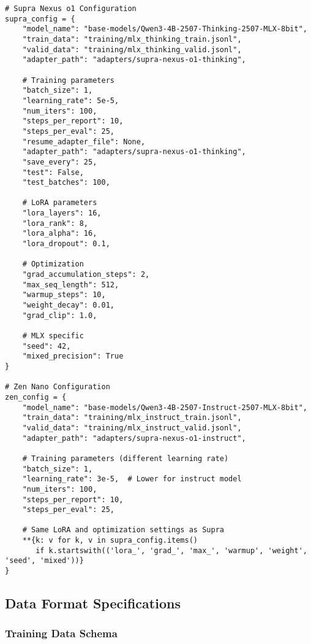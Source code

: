 \begin{lstlisting}[caption=Complete training configuration,label=lst:training-config]
# Supra Nexus o1 Configuration
supra_config = {
    "model_name": "base-models/Qwen3-4B-2507-Thinking-2507-MLX-8bit",
    "train_data": "training/mlx_thinking_train.jsonl",
    "valid_data": "training/mlx_thinking_valid.jsonl",
    "adapter_path": "adapters/supra-nexus-o1-thinking",
    
    # Training parameters
    "batch_size": 1,
    "learning_rate": 5e-5,
    "num_iters": 100,
    "steps_per_report": 10,
    "steps_per_eval": 25,
    "resume_adapter_file": None,
    "adapter_path": "adapters/supra-nexus-o1-thinking",
    "save_every": 25,
    "test": False,
    "test_batches": 100,
    
    # LoRA parameters
    "lora_layers": 16,
    "lora_rank": 8,
    "lora_alpha": 16,
    "lora_dropout": 0.1,
    
    # Optimization
    "grad_accumulation_steps": 2,
    "max_seq_length": 512,
    "warmup_steps": 10,
    "weight_decay": 0.01,
    "grad_clip": 1.0,
    
    # MLX specific
    "seed": 42,
    "mixed_precision": True
}

# Zen Nano Configuration  
zen_config = {
    "model_name": "base-models/Qwen3-4B-2507-Instruct-2507-MLX-8bit", 
    "train_data": "training/mlx_instruct_train.jsonl",
    "valid_data": "training/mlx_instruct_valid.jsonl",
    "adapter_path": "adapters/supra-nexus-o1-instruct",
    
    # Training parameters (different learning rate)
    "batch_size": 1,
    "learning_rate": 3e-5,  # Lower for instruct model
    "num_iters": 100,
    "steps_per_report": 10,
    "steps_per_eval": 25,
    
    # Same LoRA and optimization settings as Supra
    **{k: v for k, v in supra_config.items() 
       if k.startswith(('lora_', 'grad_', 'max_', 'warmup', 'weight', 'seed', 'mixed'))}
}
\end{lstlisting}

\subsection{Data Format Specifications}

\subsubsection{Training Data Schema}

